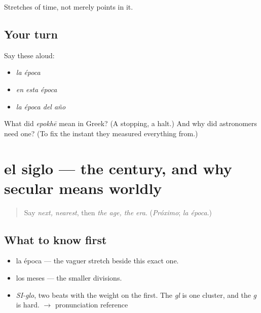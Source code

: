 \begin{grammarlens}[title={What you've built}]
Stretches of time, not merely points in it.
\end{grammarlens}

\subsection*{Your turn}
Say these aloud:

\begin{itemize}
\raggedright
  \item \emph{la época}
  \item \emph{en esta época}
  \item \emph{la época del año}
\end{itemize}

\begin{tcolorbox}[breakable,colback=teal!4,colframe=teal!35!black,title={Before you move on}]
What did \emph{epokhē} mean in Greek? (A stopping, a halt.) And why did astronomers need one? (To fix the instant they measured everything from.)
\end{tcolorbox}
\section[el siglo]{el siglo — the century, and why secular means worldly}

\label{lesson:ES-C343-siglo}



\begin{quote}
Say \emph{next, nearest}, then \emph{the age, the era}. (\emph{Próximo}; \emph{la época}.)
\end{quote}

\subsection*{What to know first}
\begin{itemize}
\raggedright
  \item la época — the vaguer stretch beside this exact one.
  \item los meses — the smaller divisions.
\end{itemize}

\begin{sounds}
\begin{itemize}
\raggedright
  \item \emph{SI-glo}, two beats with the weight on the first. The \emph{gl} is one cluster, and the \emph{g} is hard. $\to$ pronunciation reference
\end{itemize}
\end{sounds}

